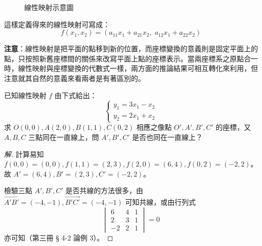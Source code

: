 \begin{figure}[H]
\centering
{}
\caption{線性映射示意圖}
\label{fig:b4-1-3-2}
\end{figure}

這樣定義得來的線性映射可寫成：
\begin{equation}
f(x_1, x_2) = (a_{11}x_1 + a_{21}x_2, \; a_{12}x_1 + a_{22}x_2) \label{eq:b4-1-3-5}
\end{equation}

\noindent\textbf{注意}：線性映射是把平面的點移到新的位置，而座標變換的意義則是固定平面上的點，只按照新舊座標間的關係來改寫平面上點的座標表示。當兩座標系之原點合一時，線性映射與座標變換的代數式一樣，兩方面的推論結果可相互轉化來利用，但注意就其自然的意義來看兩者是有著區別的。

\begin{example}[例 4]
已知線性映射 $f$ 由下式給出：
\[ \begin{cases} y_1 = 3x_1 - x_2 \\ y_2 = 2x_1 + x_2 \end{cases} \]
求 $O(0, 0), A(2, 0), B(1, 1), C(0, 2)$ 相應之像點 $O', A', B', C'$ 的座標，又 $A, B, C$ 三點同在一直線上，問 $A', B', C'$ 是否也同在一直線上？
\end{example}

\begin{proof}[解]
計算易知 $f(0, 0) = (0, 0), f(1, 1) = (2, 3), f(2, 0) = (6, 4), f(0, 2) = (-2, 2)$。故 $A' = (6, 4), B' = (2, 3), C' = (-2, 2)$。

檢驗三點 $A', B', C'$ 是否共線的方法很多，由 $\vec{A'B'} = (-4, -1), \vec{B'C'} = (-4, -1)$ 可知共線，或由行列式
\[ \begin{vmatrix} 6 & 4 & 1 \\ 2 & 3 & 1 \\ -2 & 2 & 1 \end{vmatrix} = 0 \]
亦可知（第三冊 § 4-2 論例 3）。
\end{proof}

